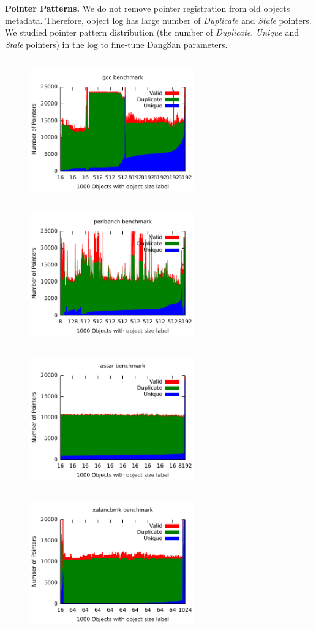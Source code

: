 \textbf{Pointer Patterns.} 
We do not remove pointer registration from old objects metadata. Therefore, object log has large number of \emph{Duplicate} and \emph{Stale} pointers. We studied pointer pattern distribution (the number of \textit{Duplicate}, \textit{Unique} and \textit{Stale} pointers) in the log to fine-tune DangSan parameters.

\begin{figure}[t]
\center
  \includegraphics[width=2.8in,height=2.4in,keepaspectratio]{plots/gcc_pointerpattern.pdf}
  \includegraphics[width=2.8in,height=2.4in,keepaspectratio]{plots/perlbench_pointerpattern.pdf}
  \includegraphics[width=2.8in,height=2.4in,keepaspectratio]{plots/astar_pointerpattern.pdf}
  \includegraphics[width=2.8in,height=2.4in,keepaspectratio]{plots/xalancbmk_pointerpattern.pdf}
  

\end{figure}
